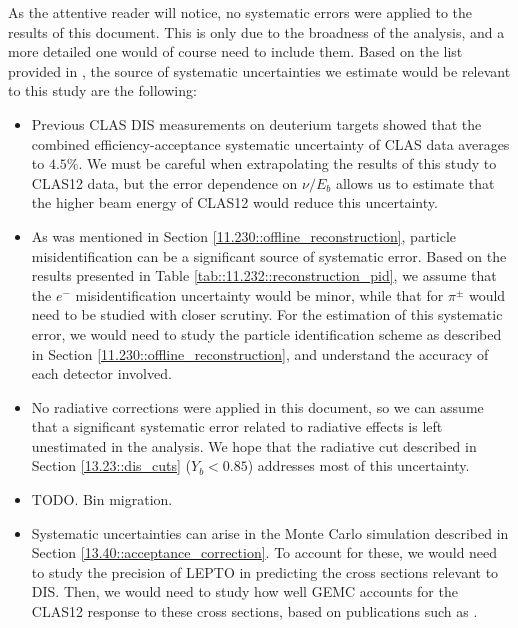     As the attentive reader will notice, no systematic errors were applied to the results of this document.
    This is only due to the broadness of the analysis, and a more detailed one would of course need to include them.
    Based on the list provided in \cite{osipenko2010}, the source of systematic uncertainties we estimate would be relevant to this study are the following:
    \begin{itemize}
        \item
            Previous CLAS DIS measurements \cite{osipenko2006} on deuterium targets showed that the combined efficiency-acceptance systematic uncertainty of CLAS data averages to $4.5\%$.
            We must be careful when extrapolating the results of this study to CLAS12 data, but the error dependence on $\nu/E_b$ allows us to estimate that the higher beam energy of CLAS12 would reduce this uncertainty.

        \item
            As was mentioned in Section \ref{11.230::offline_reconstruction}, particle misidentification can be a significant source of systematic error.
            Based on the results presented in Table \ref{tab::11.232::reconstruction_pid}, we assume that the $e^-$ misidentification uncertainty would be minor, while that for $\pi^\pm$ would need to be studied with closer scrutiny.
            For the estimation of this systematic error, we would need to study the particle identification scheme as described in Section \ref{11.230::offline_reconstruction}, and understand the accuracy of each detector involved.

        \item
            No radiative corrections were applied in this document, so we can assume that a significant systematic error related to radiative effects is left unestimated in the analysis.
            We hope that the radiative cut described in Section \ref{13.23::dis_cuts} ($Y_b < 0.85$) addresses most of this uncertainty.

        \item
            TODO. Bin migration.

        \item
            Systematic uncertainties can arise in the Monte Carlo simulation described in Section \ref{13.40::acceptance_correction}.
            To account for these, we would need to study the precision of LEPTO in predicting the cross sections relevant to DIS.
            Then, we would need to study how well GEMC accounts for the CLAS12 response to these cross sections, based on publications such as \cite{ungaro2020gemc}.


\end{itemize}
